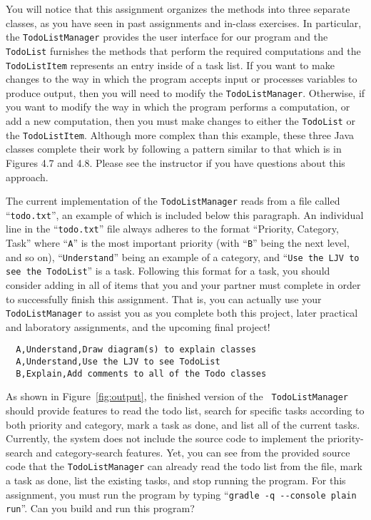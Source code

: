 \documentclass[11pt]{article}
\newcommand{\command}[1]{``\lstinline{#1}''}
\begin{document}
You will notice that this assignment organizes the methods into three separate classes, as you have seen in past
assignments and in-class exercises. In particular, the {\tt TodoListManager} provides the user interface for our program
and the {\tt TodoList} furnishes the methods that perform the required computations and the {\tt TodoListItem}
represents an entry inside of a task list. If you want to make changes to the way in which the program accepts input or
processes variables to produce output, then you will need to modify the {\tt TodoListManager}. Otherwise, if you want to
modify the way in which the program performs a computation, or add a new computation, then you must make changes to
either the {\tt TodoList} or the {\tt TodoListItem}. Although more complex than this example, these three Java classes
complete their work by following a pattern similar to that which is in Figures 4.7 and 4.8. Please see the instructor if
you have questions about this approach.

The current implementation of the {\tt TodoListManager} reads from a file called ``{\tt todo.txt}'', an example of which
is included below this paragraph. An individual line in the ``{\tt todo.txt}'' file always adheres to the format
``Priority, Category, Task'' where ``{\tt A}'' is the most important priority (with ``{\tt B}'' being the next level,
and so on), ``{\tt Understand}'' being an example of a category, and ``{\tt Use the LJV to see the TodoList}'' is a
task.  Following this format for a task, you should consider adding in all of items that you and your partner must
complete in order to successfully finish this assignment. That is, you can actually use your {\tt TodoListManager} to
assist you as you complete both this project, later practical and laboratory assignments, and the upcoming final
project!

\vspace{-0.05in}
\begin{verbatim}
  A,Understand,Draw diagram(s) to explain classes
  A,Understand,Use the LJV to see TodoList
  B,Explain,Add comments to all of the Todo classes
\end{verbatim}
\vspace{-0.05in}

As shown in Figure~\ref{fig:output}, the finished version of the {\tt
TodoListManager} should provide features to read the todo list, search for
specific tasks according to both priority and category, mark a task as done, and
list all of the current tasks. Currently, the system does not include the source
code to implement the priority-search and category-search features. Yet, you can
see from the provided source code that the {\tt TodoListManager} can already
read the todo list from the file, mark a task as done, list the existing tasks,
and stop running the program. For this assignment, you must run the program by
typing \command{gradle -q --console plain run}. Can you build and run this
program?
\end{document}
